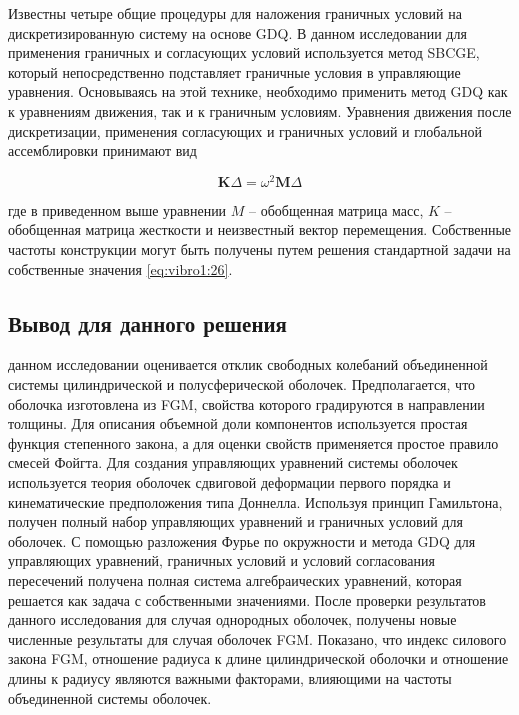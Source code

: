 Известны четыре общие процедуры для наложения граничных условий на дискретизированную систему на основе GDQ. В данном исследовании для применения граничных и согласующих условий используется метод SBCGE, который непосредственно подставляет граничные условия в управляющие уравнения. Основываясь на этой технике, необходимо применить метод GDQ как к уравнениям движения, так и к граничным условиям. Уравнения движения после дискретизации, применения согласующих и граничных условий и глобальной ассемблировки принимают вид

\begin{equation}
\label{eq:vibro1:26}
\boldsymbol{K } \Delta = \omega^2 \boldsymbol{M} \Delta
\end{equation}

где в приведенном выше уравнении \(M\) -- обобщенная матрица масс, \(K\) -- обобщенная матрица жесткости и неизвестный вектор перемещения. Собственные частоты конструкции могут быть получены путем решения стандартной задачи на собственные значения \cref{eq:vibro1:26}.

\subsection{Вывод для данного решения}\label{ch:ch3/sec2/sub5}

 данном исследовании оценивается отклик свободных колебаний объединенной системы цилиндрической и полусферической оболочек. Предполагается, что оболочка изготовлена из FGM, свойства которого градируются в направлении толщины. Для описания объемной доли компонентов используется простая функция степенного закона, а для оценки свойств применяется простое правило смесей Фойгта. Для создания управляющих уравнений системы оболочек используется теория оболочек сдвиговой деформации первого порядка и кинематические предположения типа Доннелла. Используя принцип Гамильтона, получен полный набор управляющих уравнений и граничных условий для оболочек. С помощью разложения Фурье по окружности и метода GDQ для управляющих уравнений, граничных условий и условий согласования пересечений получена полная система алгебраических уравнений, которая решается как задача с собственными значениями. После проверки результатов данного исследования для случая однородных оболочек, получены новые численные результаты для случая оболочек FGM. Показано, что индекс силового закона FGM, отношение радиуса к длине цилиндрической оболочки и отношение длины к радиусу являются важными факторами, влияющими на частоты объединенной системы оболочек.
 
